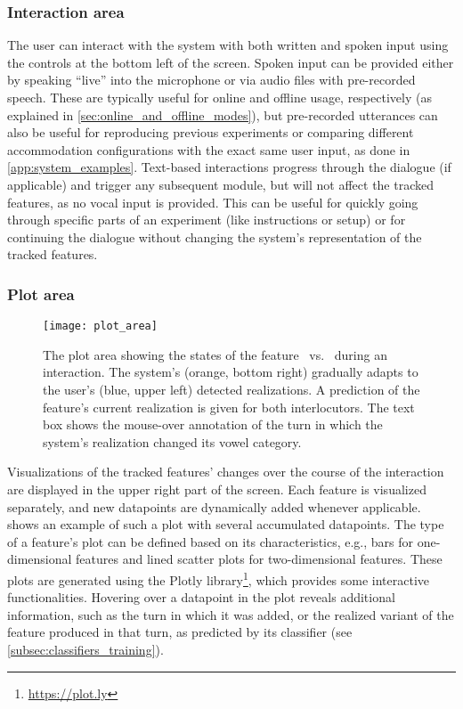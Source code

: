 \subsubsection{Interaction area}
\label{subsubsec:interaction_area}

The user can interact with the system with both written and spoken input using the controls at the bottom left of the screen.
Spoken input can be provided either by speaking \enquote{live} into the microphone or via audio files with pre-recorded speech.
These are typically useful for online and offline usage, respectively (as explained in \cref{sec:online_and_offline_modes}), but pre-recorded utterances can also be useful for reproducing previous experiments or comparing different accommodation configurations with the exact same user input, as done in \cref{app:system_examples}.
Text-based interactions progress through the dialogue (if applicable) and trigger any subsequent module, but will not affect the tracked features, as no vocal input is provided.
This can be useful for quickly going through specific parts of an experiment (like instructions or setup) or for continuing the dialogue without changing the system's representation of the tracked features.

\subsubsection{Plot area}
\label{subsubsec:plot_area}

\begin{figure}[t]
	\centering
	\texttt{[image: plot\_area]}
	\caption[Real-time dynamic visualization of phonetic changes]
		{The plot area showing the states of the feature \textipa{[E:]}~vs.~\textipa{[e:]} during an interaction.
		The system's (orange, bottom right) gradually adapts to the user's (blue, upper left) detected realizations.
		A prediction of the feature's current realization is given for both interlocutors.
		The text box shows the mouse-over annotation of the turn in which the system's realization changed its vowel category.}
	\label{fig:plot}
\end{figure}
%
Visualizations of the tracked features' changes over the course of the interaction are displayed in the upper right part of the screen.
Each feature is visualized separately, and new datapoints are dynamically added whenever applicable.
 shows an example of such a plot with several accumulated datapoints.
The type of a feature's plot can be defined based on its characteristics, e.g., bars for one-dimensional features and lined scatter plots for two-dimensional features.
These plots are generated using the Plotly library\footnote{\url{https://plot.ly}}, which provides some interactive functionalities.
Hovering over a datapoint in the plot reveals additional information, such as the turn in which it was added, or the realized variant of the feature produced in that turn, as predicted by its classifier (see \cref{subsec:classifiers_training}).

